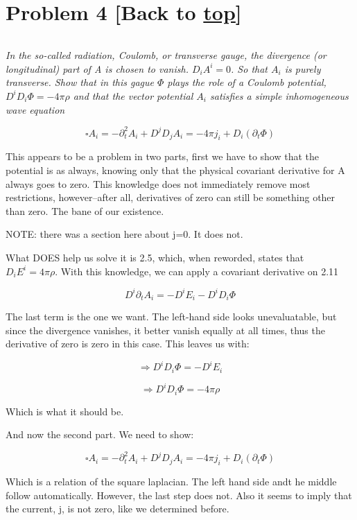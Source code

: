 \documentclass[landscape,letterpaper,10pt,english]{article}
\begin{document}
    \hypertarget{problem-4-back-to-top}{%
\section{\texorpdfstring{Problem 4 {[}Back to
\hyperref[toc]{top}{]}}{Problem 4 {[}Back to {]}}}\label{problem-4-back-to-top}}

\[\label{P4}\]

\emph{In the so-called radiation, Coulomb, or transverse gauge, the
divergence (or longitudinal) part of A is chosen to vanish.
\(D_iA^i = 0\). So that \(A_i\) is purely transverse. Show that in this
gague \(\Phi\) plays the role of a Coulomb potential,
\(D^iD_i\Phi = -4\pi \rho\) and that the vector potential \(A_i\)
satisfies a simple inhomogeneous wave equation}

\[ \square A_i = -\partial^2_t A_i + D^j D_j A_i = -4\pi j_i + D_i(\partial_t\Phi) \]

    This appears to be a problem in two parts, first we have to show that
the potential is as always, knowing only that the physical covariant
derivative for A always goes to zero. This knowledge does not
immediately remove most restrictions, however--after all, derivatives of
zero can still be something other than zero. The bane of our existence.

NOTE: there was a section here about j=0. It does not.

    What DOES help us solve it is 2.5, which, when reworded, states that
\(D_iE^i = 4\pi \rho\). With this knowledge, we can apply a covariant
derivative on 2.11

\[ D^i \partial_t A_i = -D^iE_i - D^i D_i \Phi\]

    The last term is the one we want. The left-hand side looks
unevaluatable, but since the divergence vanishes, it better vanish
equally at all times, thus the derivative of zero is zero in this case.
This leaves us with:

\[ \Rightarrow D^i D_i \Phi = -D^iE_i \]

\[ \Rightarrow D^i D_i \Phi = -4\pi \rho \]

Which is what it should be.

    And now the second part. We need to show:

\[ \square A_i = -\partial^2_t A_i + D^j D_j A_i = -4\pi j_i + D_i(\partial_t\Phi) \]

Which is a relation of the square laplacian. The left hand side andt he
middle follow automatically. However, the last step does not. Also it
seems to imply that the current, j, is not zero, like we determined
before.
\end{document}
